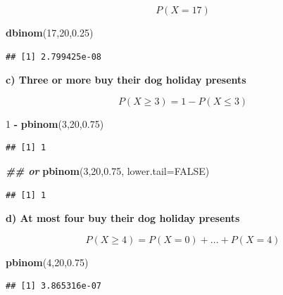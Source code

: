 \documentclass[
]{book}
\newenvironment{Shaded}{\begin{snugshade}}{\end{snugshade}}
\newcommand{\AttributeTok}[1]{\textcolor[rgb]{0.13,0.29,0.53}{#1}}
\newcommand{\ConstantTok}[1]{\textcolor[rgb]{0.56,0.35,0.01}{#1}}
\newcommand{\DecValTok}[1]{\textcolor[rgb]{0.00,0.00,0.81}{#1}}
\newcommand{\DocumentationTok}[1]{\textcolor[rgb]{0.56,0.35,0.01}{\textbf{\textit{#1}}}}
\newcommand{\FloatTok}[1]{\textcolor[rgb]{0.00,0.00,0.81}{#1}}
\newcommand{\FunctionTok}[1]{\textcolor[rgb]{0.13,0.29,0.53}{\textbf{#1}}}
\newcommand{\NormalTok}[1]{#1}
\newcommand{\SpecialCharTok}[1]{\textcolor[rgb]{0.81,0.36,0.00}{\textbf{#1}}}
\begin{document}
\[P(X=17)\]

\begin{Shaded}
\begin{Highlighting}[]
\FunctionTok{dbinom}\NormalTok{(}\DecValTok{17}\NormalTok{,}\DecValTok{20}\NormalTok{,}\FloatTok{0.25}\NormalTok{)}
\end{Highlighting}
\end{Shaded}

\begin{verbatim}
## [1] 2.799425e-08
\end{verbatim}

\textbf{c) Three or more buy their dog holiday presents}

\[P(X\ge 3)=1-P(X \le 3)\]

\begin{Shaded}
\begin{Highlighting}[]
\DecValTok{1} \SpecialCharTok{{-}} \FunctionTok{pbinom}\NormalTok{(}\DecValTok{3}\NormalTok{,}\DecValTok{20}\NormalTok{,}\FloatTok{0.75}\NormalTok{)}
\end{Highlighting}
\end{Shaded}

\begin{verbatim}
## [1] 1
\end{verbatim}

\begin{Shaded}
\begin{Highlighting}[]
\DocumentationTok{\#\# or}
\FunctionTok{pbinom}\NormalTok{(}\DecValTok{3}\NormalTok{,}\DecValTok{20}\NormalTok{,}\FloatTok{0.75}\NormalTok{, }\AttributeTok{lower.tail=}\ConstantTok{FALSE}\NormalTok{)}
\end{Highlighting}
\end{Shaded}

\begin{verbatim}
## [1] 1
\end{verbatim}

\textbf{d) At most four buy their dog holiday presents}

\[P(X\ge 4)=P(X = 0)+...+P(X=4)\]

\begin{Shaded}
\begin{Highlighting}[]
\FunctionTok{pbinom}\NormalTok{(}\DecValTok{4}\NormalTok{,}\DecValTok{20}\NormalTok{,}\FloatTok{0.75}\NormalTok{)}
\end{Highlighting}
\end{Shaded}

\begin{verbatim}
## [1] 3.865316e-07
\end{verbatim}
\end{document}
